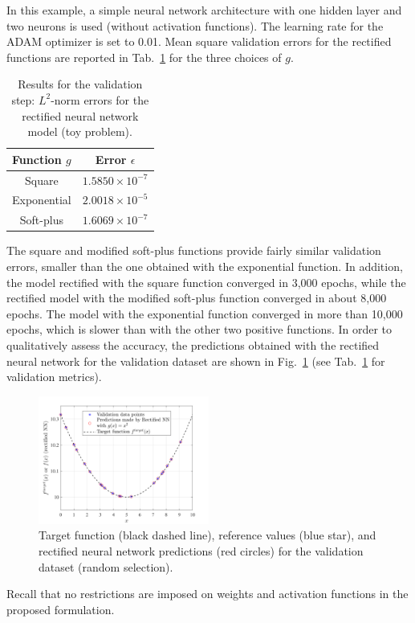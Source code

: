 In this example, a simple neural network architecture with one hidden layer and two neurons is used (without activation functions). The learning rate for the ADAM optimizer is set to 0.01. Mean square validation errors for the rectified functions are reported in Tab.~\ref{tab:toy-problem-validation-errors} for the three choices of $g$. 
\begin{table}[ht!]
\caption[Results for the validation step (toy problem).]{Results for the validation step: $L^2$-norm errors for the rectified neural network model (toy problem).}
\label{tab:toy-problem-validation-errors}
\begin{center}
    \begin{tabular}{|c|c|} 
        \hline
        Function $g$ & Error $\epsilon$ \\ 
        \hline
        Square & $1.5850 \times 10^{-7}$ \\ 
        \hline
        Exponential & $2.0018 \times 10^{-5}$ \\ 
        \hline
        Soft-plus & $1.6069 \times 10^{-7}$ \\ 
        \hline
        \end{tabular}
\end{center}
\end{table}
The square and modified soft-plus functions provide fairly similar validation errors, smaller than the one obtained with the exponential function. In addition, the model rectified with the square function converged in 3,000 epochs, while the rectified model with the modified soft-plus function converged in about 8,000 epochs. The model with the exponential function converged in more than 10,000 epochs, which is slower than with the other two positive functions. In order to qualitatively assess the accuracy, the predictions obtained with the rectified neural network for the validation dataset are shown in Fig.~\ref{fig:toy-problem-qualitative-results} (see Tab.~\ref{tab:toy-problem-validation-errors} for validation metrics).
\begin{figure}[ht!]
    \begin{center}
        \includegraphics[width = 0.5\textwidth]{Pictures/toy.png}
    \end{center}
    \caption[Target function, reference values, and rectified neural network predictions.]{Target function (black dashed line), reference values (blue star), and rectified neural network predictions (red circles) for the validation dataset (random selection).}
    \label{fig:toy-problem-qualitative-results}
\end{figure}
Recall that no restrictions are imposed on weights and activation functions in the proposed formulation.

